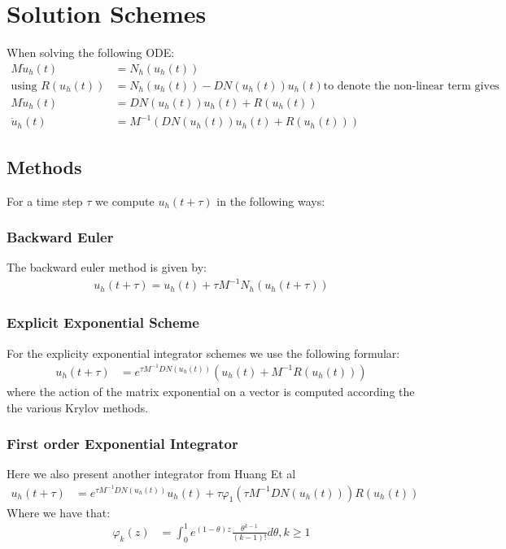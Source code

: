 \section{Solution Schemes}

When solving the following ODE:
\begin{align*}
M\dot u_h(t) &= N_h(u_h(t))\\ %
\text{using } R(u_h(t)) &= N_h(u_h(t)) - DN(u_h(t))u_h(t) \text{to denote the non-linear term gives}\\
M\dot u_h(t) &= DN(u_h(t))u_h(t) + R(u_h(t))\\
\dot u_h(t) &= M^{-1}(DN(u_h(t))u_h(t) + R(u_h(t)))
\end{align*}
\subsection{Methods}
For a time step $\tau$ we compute $u_h(t+\tau)$ in the following ways: 
\subsubsection{Backward Euler}
The backward euler method is given by:
\begin{align*}
u_h(t+\tau) = u_h(t) + \tau M^{-1}N_h(u_h(t+\tau))
\end{align*}
\subsubsection{Explicit Exponential Scheme} %
For the explicity exponential integrator schemes we use the following formular:
\begin{align*}
u_h(t+\tau) &= e^{\tau M^{-1} DN(u_h(t))}(u_h(t) + M^{-1}R(u_h(t)))
\end{align*}
where the action of the matrix exponential on a vector is computed according the the various Krylov methods.

\subsubsection{First order Exponential Integrator}
Here we also present another integrator from Huang Et al \cite{Huang2022}
\begin{align*}
u_h(t+\tau) &= e^{\tau M^{-1} DN(u_h(t))}u_h(t) + \tau \varphi_1(\tau M^{-1} DN(u_h(t)))R(u_h(t))
\end{align*}
Where we have that:
\begin{align*}
    \varphi_k(z) &= \int^1_0e^{(1-\theta)z}\frac{\theta^{k-1}}{(k-1)!}d\theta, k \geq 1
\end{align*}

